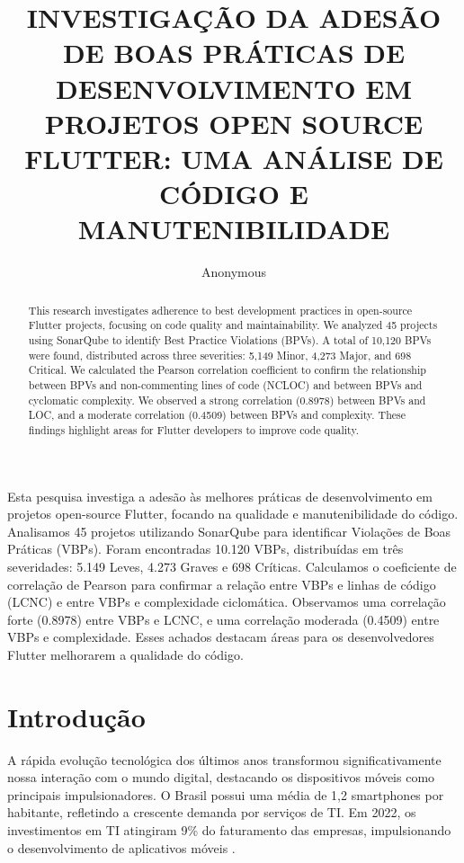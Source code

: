 \documentclass[12pt]{article}
\title{INVESTIGAÇÃO DA ADESÃO DE BOAS PRÁTICAS DE DESENVOLVIMENTO EM PROJETOS OPEN SOURCE FLUTTER: UMA ANÁLISE DE CÓDIGO E MANUTENIBILIDADE
}
\author{Anonymous\inst{1}}
\begin{document}
 

\maketitle

\begin{abstract}
This research investigates adherence to best development practices in open-source Flutter projects, focusing on code quality and maintainability. We analyzed 45 projects using SonarQube to identify Best Practice Violations (BPVs). A total of 10,120 BPVs were found, distributed across three severities: 5,149 Minor, 4,273 Major, and 698 Critical. We calculated the Pearson correlation coefficient to confirm the relationship between BPVs and non-commenting lines of code (NCLOC) and between BPVs and cyclomatic complexity. We observed a strong correlation (0.8978) between BPVs and LOC, and a moderate correlation (0.4509) between BPVs and complexity. These findings highlight areas for Flutter developers to improve code quality.
\end{abstract}
     
\begin{resumo} 
Esta pesquisa investiga a adesão às melhores práticas de desenvolvimento em projetos open-source Flutter, focando na qualidade e manutenibilidade do código. Analisamos 45 projetos utilizando SonarQube para identificar Violações de Boas Práticas (VBPs). Foram encontradas 10.120 VBPs, distribuídas em três severidades: 5.149 Leves, 4.273 Graves e 698 Críticas. Calculamos o coeficiente de correlação de Pearson para confirmar a relação entre VBPs e linhas de código (LCNC) e entre VBPs e complexidade ciclomática. Observamos uma correlação forte (0.8978) entre VBPs e LCNC, e uma correlação moderada (0.4509) entre VBPs e complexidade. Esses achados destacam áreas para os desenvolvedores Flutter melhorarem a qualidade do código.
\end{resumo}

\section{Introdução}
A rápida evolução tecnológica dos últimos anos transformou significativamente nossa interação com o mundo digital, destacando os dispositivos móveis como principais impulsionadores. O Brasil possui uma média de 1,2 smartphones por habitante, refletindo a crescente demanda por serviços de TI. Em 2022, os investimentos em TI atingiram 9\% do faturamento das empresas, impulsionando o desenvolvimento de aplicativos móveis \cite{FGVcia2023}.
\end{document}
